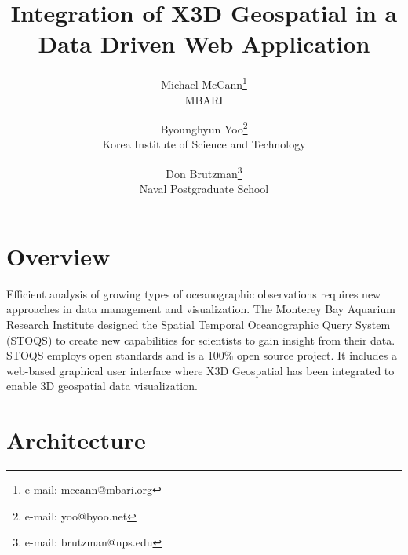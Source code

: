 \documentclass[annualconference]{acmsiggraph}  %
\title{Integration of X3D Geospatial in a Data Driven Web Application}
\author{Michael McCann\thanks{e-mail: mccann@mbari.org}\\MBARI
\and Byounghyun Yoo\thanks{e-mail: yoo@byoo.net}\\Korea Institute of Science and Technology
\and Don Brutzman\thanks{e-mail: brutzman@nps.edu}\\Naval Postgraduate School}
\begin{document}

\maketitle








\section{Overview}

Efficient analysis of growing types of oceanographic observations requires new approaches in data management and visualization. The Monterey Bay Aquarium Research Institute designed the Spatial Temporal Oceanographic Query System (STOQS) \cite{STOQS} to create new capabilities for scientists to gain insight from their data. STOQS employs open standards and is a 100\% open source project. It includes a web-based graphical user interface where X3D Geospatial has been integrated to enable 3D geospatial data visualization. 

\section{Architecture}
\end{document}
